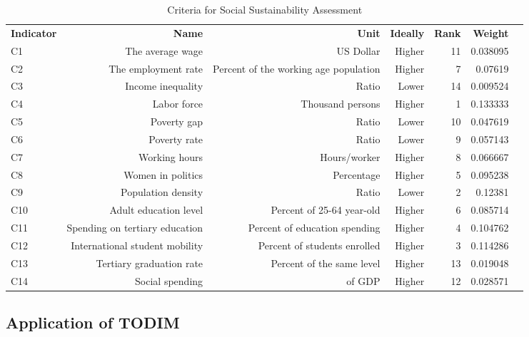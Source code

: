\documentclass{infor}
\theoremstyle{remark}
\begin{document}
\begin{table}[!htp]\centering
\caption{Criteria for Social Sustainability Assessment}\label{Table 1}
\scriptsize
\begin{tabular}{lrrrrrr}\toprule
\textbf{Indicator} &\textbf{Name} &\textbf{Unit} &\textbf{Ideally} &\textbf{Rank} &\textbf{Weight}\\ \cmidrule{1-6}
C1 &The average wage &US Dollar &Higher &11 &0.038095\\%
C2 &The employment rate & Percent of the working age population &Higher &7 &0.07619 \\ %
C3 &Income inequality &Ratio &Lower &14 &0.009524\\ %
C4 &Labor force &Thousand persons &Higher &1 &0.133333\\ %
C5 &Poverty gap &Ratio &Lower &10 &0.047619\\
C6 &Poverty rate &Ratio &Lower &9 &0.057143\\
C7 &Working hours &Hours/worker &Higher &8 &0.066667\\
C8 &Women in politics &Percentage &Higher &5 &0.095238\\
C9 &Population density &Ratio &Lower &2 &0.12381\\
C10 &Adult education level & Percent of 25-64 year-old &Higher &6 &0.085714\\
C11 &Spending on tertiary education & Percent of education spending &Higher &4 &0.104762\\
C12 &International student mobility & Percent of students enrolled &Higher &3 &0.114286\\
C13 &Tertiary graduation rate & Percent of the same level &Higher &13 &0.019048\\
C14 &Social spending & of GDP &Higher &12 &0.028571  \\
\bottomrule
\end{tabular}
\end{table}

\subsection{Application of TODIM}
\end{document}
